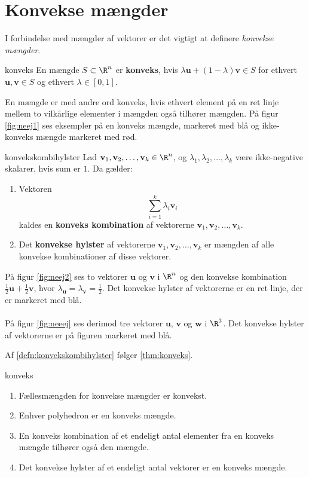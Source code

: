 \section{Konvekse mængder}
\label{julieerlakker}
%
I forbindelse med mængder af vektorer er det vigtigt at definere \textit{konvekse mængder}.
%
\begin{defn}{}{konveks}
En mængde $S \subset \R^n$ er \textbf{konveks}, hvis $\lambda \textbf{u} + (1- \lambda ) \textbf{v} \in S$ for ethvert $\textbf{u}, \textbf{v} \in S$ og ethvert $\lambda \in [0,1]$. 
\end{defn}
\noindent
%
En mængde er med andre ord konveks, hvis ethvert element på en ret linje mellem to vilkårlige elementer i mængden også tilhører mængden. 
På figur \ref{fig:neej1} ses eksempler på en konveks mængde, markeret med blå og ikke-konveks mængde markeret med rød. 
%

%
\begin{defn}{}{konvekskombihylster}
Lad $\textbf{v}_1, \textbf{v}_2, \ldots, \textbf{v}_k \in \R^n$, og $\lambda_1, \lambda_2, \ldots, \lambda_k$ være ikke-negative skalarer, hvis sum er $1$. Da gælder:
%
\begin{enumerate}[label=(\alph*)]
	\item Vektoren $$\sum_{i=1}^{k} \lambda_i \textbf{v}_i$$ kaldes en \textbf{konveks kombination} af vektorerne $\textbf{v}_1, \textbf{v}_2, \ldots, \textbf{v}_k$. 
	\item Det \textbf{konvekse hylster} af vektorerne $\textbf{v}_1, \textbf{v}_2, \ldots, \textbf{v}_k$ er mængden af alle konvekse kombinationer af disse vektorer. 
\end{enumerate}
%
%
\end{defn}
%
På figur \ref{fig:neej2} ses to vektorer $\mathbf{u}$ og $\mathbf{v}$ i $\R^n$ og den konvekse kombination $\frac{1}{2} \mathbf{u}+\frac{1}{2} \mathbf{v}$, hvor $\lambda_\textbf{u} = \lambda_\textbf{v} = \frac{1}{2}$. 
Det konvekse hylster af vektorerne er en ret linje, der er markeret med blå. 
\\\\
%

%
På figur \ref{fig:neeej} ses derimod tre vektorer $\mathbf{u}$, $\mathbf{v}$ og $\mathbf{w}$ i $\R^3$. 
Det konvekse hylster af vektorerne er på figuren markeret med blå.
%

%
Af \ref{defn:konvekskombihylster} følger \ref{thm:konveks}.
%
\begin{thm}{}{konveks}
\begin{enumerate}[label=(\alph*)]
	\item Fællesmængden for konvekse mængder er konvekst. 
	\item Enhver polyhedron er en konveks mængde.
	\item En konveks kombination af et endeligt antal elementer fra en konveks mængde tilhører også den mængde. 
	\item Det konvekse hylster af et endeligt antal vektorer er en konveks mængde. 
\end{enumerate}
\end{thm}
